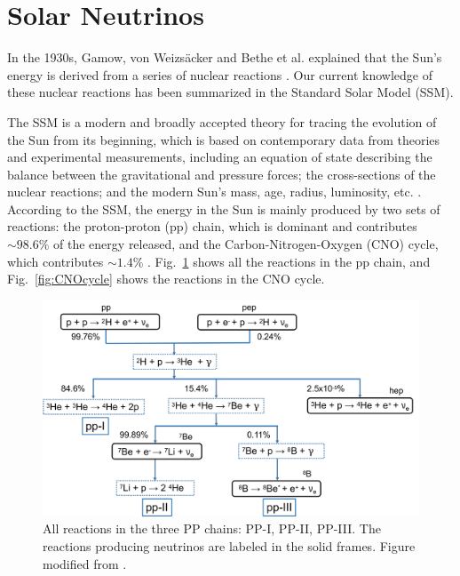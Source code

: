 \section{Solar Neutrinos}\label{sect:solarNu}

In the 1930s, Gamow, von Weizs{\"a}cker and Bethe et al. explained that the Sun's energy is derived from a series of nuclear reactions \cite{bethe1939energy}. Our current knowledge of these nuclear reactions has been summarized in the Standard Solar Model (SSM). 

The SSM is a modern and broadly accepted theory for tracing the evolution of the Sun from its beginning, which is based on contemporary data from theories and experimental measurements, including an equation of state describing the balance between the gravitational and pressure forces; the cross-sections of the nuclear reactions; and the modern Sun's mass, age, radius, luminosity, etc. \cite{haxton2013solar}. According to the SSM, the energy in the Sun is mainly produced by two sets of reactions: the proton-proton (pp) chain, which is dominant and contributes $\sim 98.6\%$ of the energy released, and the Carbon-Nitrogen-Oxygen (CNO) cycle, which contributes $\sim 1.4\%$ \cite{antonio2018state}. Fig.~\ref{fig:ppChain} shows all the reactions in the pp chain, and Fig.~\ref{fig:CNOcycle} shows the reactions in the CNO cycle. 

\begin{figure}[htbp]
	\centering	
	\includegraphics[width=14cm]{ppChain.png}
	\caption[All reactions in the three PP chains.]{All reactions in the three PP chains: PP-I, PP-II, PP-III. The reactions producing neutrinos are labeled in the solid frames. Figure modified from \cite{oberauer2020solar}.	\label{fig:ppChain}}
\end{figure}

